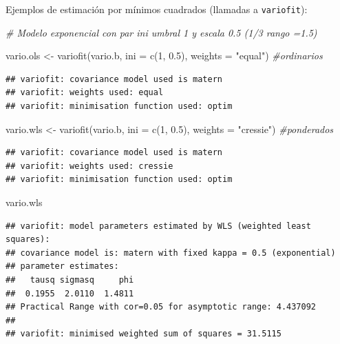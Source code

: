 \documentclass[
  spanish,
]{book}
\newenvironment{Shaded}{\begin{snugshade}}{\end{snugshade}}
\newcommand{\AttributeTok}[1]{\textcolor[rgb]{0.77,0.63,0.00}{#1}}
\newcommand{\CommentTok}[1]{\textcolor[rgb]{0.56,0.35,0.01}{\textit{#1}}}
\newcommand{\DecValTok}[1]{\textcolor[rgb]{0.00,0.00,0.81}{#1}}
\newcommand{\FloatTok}[1]{\textcolor[rgb]{0.00,0.00,0.81}{#1}}
\newcommand{\FunctionTok}[1]{\textcolor[rgb]{0.00,0.00,0.00}{#1}}
\newcommand{\NormalTok}[1]{#1}
\newcommand{\OtherTok}[1]{\textcolor[rgb]{0.56,0.35,0.01}{#1}}
\newcommand{\StringTok}[1]{\textcolor[rgb]{0.31,0.60,0.02}{#1}}
\theoremstyle{break}
\begin{document}
Ejemplos de estimación por mínimos cuadrados (llamadas a \texttt{variofit}):

\begin{Shaded}
\begin{Highlighting}[]
\CommentTok{\#   Modelo exponencial con par ini umbral 1 y escala 0.5 (1/3 rango =1.5)}

\NormalTok{vario.ols }\OtherTok{\textless{}{-}} \FunctionTok{variofit}\NormalTok{(vario.b, }\AttributeTok{ini =} \FunctionTok{c}\NormalTok{(}\DecValTok{1}\NormalTok{, }\FloatTok{0.5}\NormalTok{), }\AttributeTok{weights =} \StringTok{"equal"}\NormalTok{)  }\CommentTok{\#ordinarios}
\end{Highlighting}
\end{Shaded}

\begin{verbatim}
## variofit: covariance model used is matern 
## variofit: weights used: equal 
## variofit: minimisation function used: optim
\end{verbatim}

\begin{Shaded}
\begin{Highlighting}[]
\NormalTok{vario.wls }\OtherTok{\textless{}{-}} \FunctionTok{variofit}\NormalTok{(vario.b, }\AttributeTok{ini =} \FunctionTok{c}\NormalTok{(}\DecValTok{1}\NormalTok{, }\FloatTok{0.5}\NormalTok{), }\AttributeTok{weights =} \StringTok{"cressie"}\NormalTok{)  }\CommentTok{\#ponderados}
\end{Highlighting}
\end{Shaded}

\begin{verbatim}
## variofit: covariance model used is matern 
## variofit: weights used: cressie 
## variofit: minimisation function used: optim
\end{verbatim}

\begin{Shaded}
\begin{Highlighting}[]
\NormalTok{vario.wls}
\end{Highlighting}
\end{Shaded}

\begin{verbatim}
## variofit: model parameters estimated by WLS (weighted least squares):
## covariance model is: matern with fixed kappa = 0.5 (exponential)
## parameter estimates:
##   tausq sigmasq     phi 
##  0.1955  2.0110  1.4811 
## Practical Range with cor=0.05 for asymptotic range: 4.437092
## 
## variofit: minimised weighted sum of squares = 31.5115
\end{verbatim}
\end{document}

